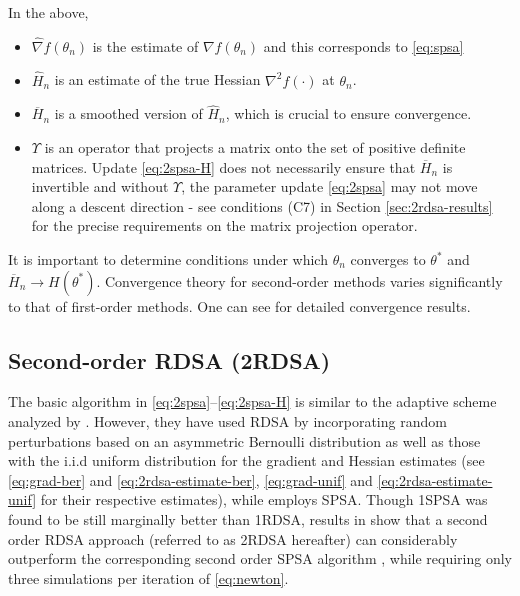 In the above, 
\begin{itemize}
 \item $\widehat\nabla f(\theta_n)$ is the estimate of $\nabla f(\theta_n)$ and this corresponds to \eqref{eq:spsa} 
  \item $\widehat H_n$ is an estimate of the true Hessian ${\nabla}^2 f(\cdot)$ at $\theta_n$. 
 \item $\overline H_n$ is a smoothed version of $\widehat H_n$, which is crucial to ensure convergence. 
 \item $\Upsilon$ is an operator that projects a matrix onto the set of positive definite matrices. Update \eqref{eq:2spsa-H} does not necessarily ensure that $\overline H_n$ is invertible and without $\Upsilon$, the parameter update \eqref{eq:2spsa} may not move along a descent direction - see conditions (C7)  in Section \ref{sec:2rdsa-results}  for the precise requirements on the matrix projection operator.
\end{itemize}
It is important to determine conditions under which $\theta_n$ converges to $\theta^*$ and $\overline H_n \to H(\theta^*)$. Convergence theory for second-order methods varies significantly to that of first-order methods. One can see \cite{spall_adaptive} for detailed convergence results.
\subsection{Second-order RDSA (2RDSA)}
The basic algorithm in \eqref{eq:2spsa}--\eqref{eq:2spsa-H} is similar to the adaptive scheme analyzed by \cite{prashanth2015rdsa}. However, they have used RDSA by incorporating random perturbations based on an asymmetric Bernoulli
distribution as well as those with the  i.i.d uniform distribution for the gradient and Hessian estimates (see \eqref{eq:grad-ber} and \eqref{eq:2rdsa-estimate-ber}, \eqref{eq:grad-unif} and \eqref{eq:2rdsa-estimate-unif} for their respective estimates), while \cite{spall_adaptive} employs SPSA. Though 1SPSA was found to be still marginally better than 1RDSA, results in \cite{prashanth2015rdsa} show that a second order RDSA approach (referred to as 2RDSA hereafter) can considerably outperform the corresponding second order SPSA algorithm \cite{spall_adaptive}, while requiring only three simulations per iteration of \eqref{eq:newton}.
